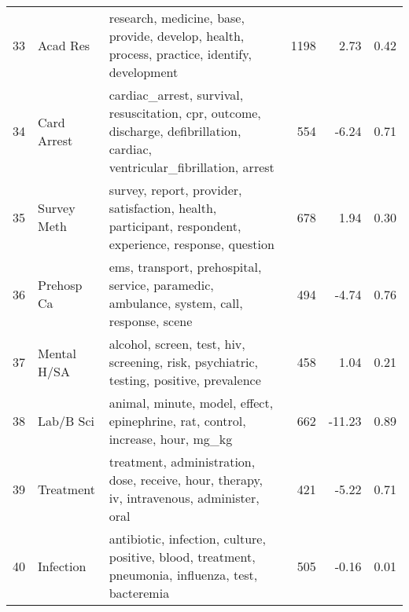 \begin{tabular}{rllrrr}
    33 &      Acad Res &                                 research, medicine, base, provide, develop, health, process, practice, identify, development &            1198 &              2.73 &  0.42 \\
    34 &   Card Arrest &  cardiac\_arrest, survival, resuscitation, cpr, outcome, discharge, defibrillation, cardiac, ventricular\_fibrillation, arrest &             554 &             -6.24 &  0.71 \\
    35 &   Survey Meth &                      survey, report, provider, satisfaction, health, participant, respondent, experience, response, question &             678 &              1.94 &  0.30 \\
    36 &    Prehosp Ca &                                    ems, transport, prehospital, service, paramedic, ambulance, system, call, response, scene &             494 &             -4.74 &  0.76 \\
    37 &   Mental H/SA &                                      alcohol, screen, test, hiv, screening, risk, psychiatric, testing, positive, prevalence &             458 &              1.04 &  0.21 \\
    38 &     Lab/B Sci &                                              animal, minute, model, effect, epinephrine, rat, control, increase, hour, mg\_kg &             662 &            -11.23 &  0.89 \\
    39 &     Treatment &                                   treatment, administration, dose, receive, hour, therapy, iv, intravenous, administer, oral &             421 &             -5.22 &  0.71 \\
    40 &     Infection &                           antibiotic, infection, culture, positive, blood, treatment, pneumonia, influenza, test, bacteremia &             505 &             -0.16 &  0.01 \\
\bottomrule
\end{tabular}
